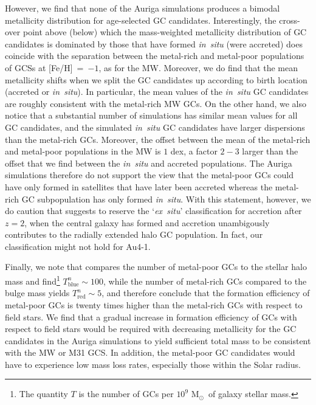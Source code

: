 \documentclass[a4paper,fleqn,usenatbib]{mnras}
\newcommand{\Sun}[0]{\ensuremath{_{\odot}}}
\begin{document}
However, we find that none of the Auriga simulations produces a bimodal 
metallicity distribution for age-selected GC candidates. Interestingly, the 
cross-over point above (below) which the mass-weighted metallicity distribution
of GC candidates is dominated by those that have formed {\it in~situ} (were
accreted) does coincide with the separation between the metal-rich and metal-poor
populations of GCSs at [Fe/H]~=~$-1$, as for the MW. Moreover, we do find 
that the mean metallicity shifts when we split the GC candidates up according 
to birth location (accreted or {\it in~situ}). In particular, the mean values of 
the {\it in~situ} GC candidates are roughly consistent with the metal-rich MW GCs.
On the other hand, we also notice that a substantial number of simulations has similar 
mean values for all GC candidates, and the simulated {\it in~situ} GC candidates 
have larger dispersions than the metal-rich GCs. Moreover, the offset between 
the mean of the metal-rich and metal-poor populations in the MW is $1$ dex, a
factor $2-3$ larger than the offset that we find between the {\it in~situ} and 
accreted populations. The Auriga simulations therefore do not support the view 
that the metal-poor GCs could have only formed in satellites that have later been 
accreted whereas the metal-rich GC subpopulation has only formed {\it in~situ}. 
With this statement, however, we do caution that \citet{2019MNRAS.486.3134K} suggests 
to reserve the `{\it ex~situ}' classification for accretion after $z=2$, when
the central galaxy has formed and accretion unambigously contributes to the
radially extended halo GC population. In fact, our classification might not hold
for Au4-1.

Finally, we note that \citet{2006ARA&A..44..193B} compares the number of metal-poor 
GCs to the stellar halo mass and find\footnote{The quantity $T$ is the number of 
GCs per $10^9$ M\Sun \, of galaxy stellar mass.} $T^n_{\text{blue}} \sim 100$, 
while the number of metal-rich GCs compared to the bulge mass yields 
$T^n_{\text{red}} \sim 5$, and therefore conclude that the formation efficiency
of metal-poor GCs is twenty times higher than the metal-rich GCs with respect to 
field stars. We find that a gradual increase in formation efficiency of GCs
with respect to field stars would be required with decreasing metallicity for
the GC candidates in the Auriga simulations to yield sufficient total mass to
be consistent with the MW or M31 GCS. In addition, the metal-poor GC candidates
would have to experience low mass loss rates, especially those within the Solar
radius.
\end{document}
